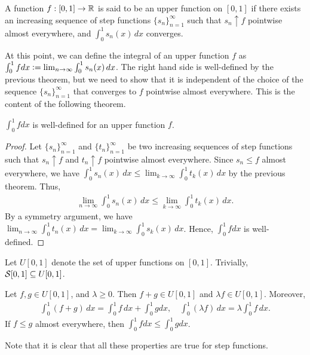 \begin{definition}
    A function $f:[0,1] \to \mathbb{R}$ is said to be an upper function on $[0,1]$ if there exists an increasing sequence of step functions $\{s_{n}\}_{n=1}^{\infty}$ such that $s_{n} \uparrow f$ pointwise almost everywhere, and $\int_{0}^{1} s_{n}(x) \, dx$ converges.
\end{definition}

At this point, we can define the integral of an upper function $f$ as $\int_{0}^{1} f dx \vcentcolon= \lim_{n \to \infty} \int_{0}^{1} s_{n}(x) \, dx$. The right hand side is well-defined by the previous theorem, but we need to show that it is independent of the choice of the sequence $\{s_{n}\}_{n=1}^{\infty}$ that converges to $f$ pointwise almost everywhere. This is the content of the following theorem.

\begin{theorem}
    $\int_{0}^{1} f dx$ is well-defined for an upper function $f$.
\end{theorem}

\begin{proof}
    Let $\{s_{n}\}_{n=1}^{\infty}$ and $\{t_{n}\}_{n=1}^{\infty}$ be two increasing sequences of step functions such that $s_{n} \uparrow f$ and $t_{n} \uparrow f$ pointwise almost everywhere. Since $s_{n} \leq f$ almost everywhere, we have $\int_{0}^{1} s_{n}(x) \, dx \leq \lim_{k \to \infty} \int_{0}^{1} t_{k}(x) \, dx$ by the previous theorem. Thus,
    \begin{align}
        \lim_{n \to \infty} \int_{0}^{1} s_{n}(x) \, dx \leq \lim_{k \to \infty} \int_{0}^{1} t_{k}(x) \, dx.
    \end{align}
    By a symmetry argument, we have $\lim_{n \to \infty} \int_{0}^{1} t_{n}(x) \, dx = \lim_{k \to \infty} \int_{0}^{1} s_{k}(x) \, dx$. Hence, $\int_{0}^{1} f dx$ is well-defined.
\end{proof}

Let $U[0,1]$ denote the set of upper functions on $[0,1]$. Trivially, $\mathcal{S}[0,1] \subseteq U[0,1]$.

\begin{theorem}
    Let $f,g \in U[0,1]$, and $\lambda \geq 0$. Then $f+g \in U[0,1]$ and $\lambda f \in U[0,1]$. Moreover,
    \begin{align}
        \int_{0}^{1} (f+g)\,dx = \int_{0}^{1} f \,dx + \int_{0}^{1} g dx, \quad \int_{0}^{1} (\lambda f) \,dx = \lambda \int_{0}^{1} f \,dx.
    \end{align}
    If $f \leq g$ almost everywhere, then $\int_{0}^{1} f dx \leq \int_{0}^{1} g dx$.
\end{theorem}
Note that it is clear that all these properties are true for step functions.

